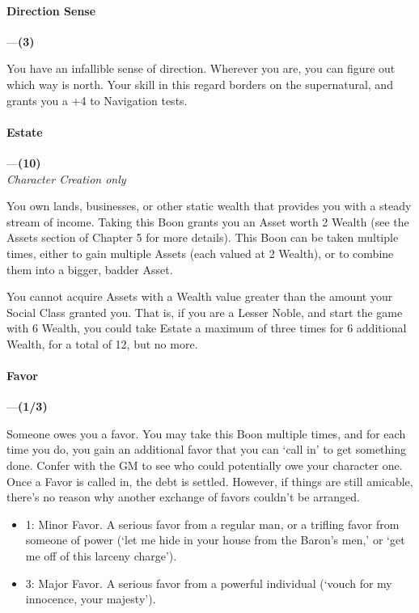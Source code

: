 \documentclass[oneside,11pt,english]{book}
\begin{document}
\paragraph{\label{boon:Direction Sense}Direction Sense}---\quad\textbf{(3)}\par
You have an infallible sense of direction. Wherever you are, you can figure out which way is north. Your skill in this regard borders on the supernatural, and grants you a +4 to Navigation tests.
\paragraph{\label{boon:Estate}Estate}---\quad\textbf{(10)}\\
\textit{Character Creation only}\par
You own lands, businesses, or other static wealth that provides you with a steady stream of income. 
Taking this Boon grants you an Asset worth 2 Wealth (see the Assets section of Chapter 5 for more 
details). This Boon can be taken multiple times, either to gain multiple Assets (each valued at 2 Wealth), 
or to combine them into a bigger, badder Asset. 


You cannot acquire Assets with a Wealth value greater than the amount your Social Class granted you. 
That is, if you are a Lesser Noble, and start the game with 6 Wealth, you could take Estate a maximum of 
three times for 6 additional Wealth, for a total of 12, but no more. 
\paragraph{\label{boon:Favor}Favor}---\quad\textbf{(1/3)}\par
Someone owes you a favor. You may take this Boon multiple times, and for each time you do, you gain 
an additional favor that you can ‘call in’ to get something done. Confer with the GM to see who could 
potentially owe your character one. Once a Favor is called in, the debt is settled. However, if things are 
still amicable, there's no reason why another exchange of favors couldn't be arranged. 
\begin{itemize}
\item 1: Minor Favor. A serious favor from a regular man, or a trifling favor from someone of power (‘let me hide in your house from the Baron's men,’ or ‘get me off of this larceny charge’).
\item 3: Major Favor. A serious favor from a powerful individual (‘vouch for my innocence, your majesty’).
\end{itemize}
\end{document}
